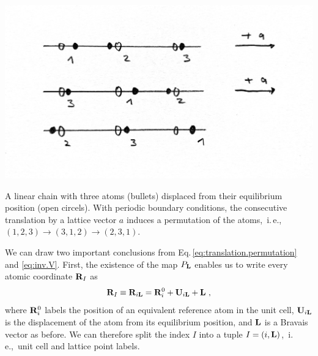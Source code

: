 \begin{marginfigure}
	\centering
	\includegraphics[width=\textwidth]{./sketches/permutation1.jpg}
	\caption{A linear chain with three atoms (bullets) displaced from their equilibrium position (open circels). With periodic boundary conditions, the consecutive translation by a lattice vector $a$ induces a permutation of the atoms,~i.\,e.,~$(1, 2 , 3) \to (3, 1, 2) \to (2, 3, 1)$.}
	\label{fig:translation.permutation}
\end{marginfigure}

We can draw two important conclusions from Eq.\,\eqref{eq:translation.permutation} and \eqref{eq:inv.V}. First, the existence of the map $P_{\bf L}$ enables us to write every atomic coordinate ${\bf R}_I$ as
\begin{align}
	{\bf R}_I \equiv {\bf R}_{i {\bf L}} 
		= {\bf R}^0_i + {\bf U}_{i {\bf L}} + {\bf L}~,
	\label{eq:R_iL}
\end{align}
where ${\bf R}^0_i$ labels the position of an equivalent reference atom in the unit cell, ${\bf U}_{i {\bf L}}$ is the displacement of the atom from its equilibrium position, and $\bf L$ is a Bravais vector as before.
We can therefore split the index $I$ into a tuple $I = (i, {\bf L})$,~i.\,e.,~unit cell and lattice point labels.

